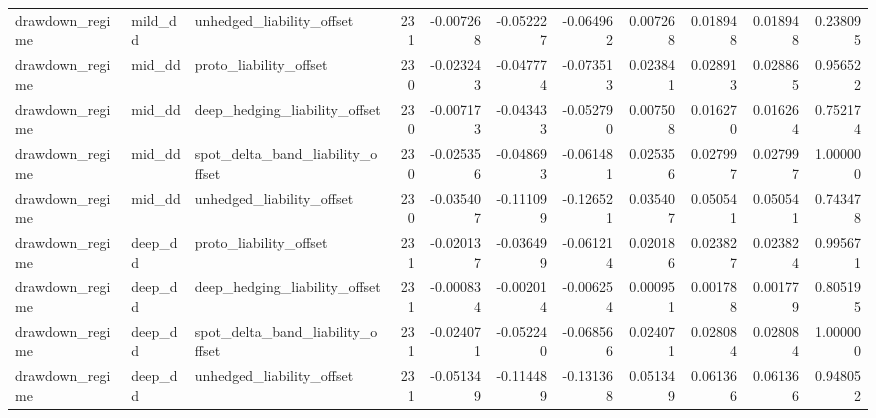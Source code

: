\begin{tabular}{lllrrrrrrrr}
drawdown\_regime & mild\_dd & unhedged\_liability\_offset & 231 & -0.007268 & -0.052227 & -0.064962 & 0.007268 & 0.018948 & 0.018948 & 0.238095 \\
drawdown\_regime & mid\_dd & proto\_liability\_offset & 230 & -0.023243 & -0.047774 & -0.073513 & 0.023841 & 0.028913 & 0.028865 & 0.956522 \\
drawdown\_regime & mid\_dd & deep\_hedging\_liability\_offset & 230 & -0.007173 & -0.043433 & -0.052790 & 0.007508 & 0.016270 & 0.016264 & 0.752174 \\
drawdown\_regime & mid\_dd & spot\_delta\_band\_liability\_offset & 230 & -0.025356 & -0.048693 & -0.061481 & 0.025356 & 0.027997 & 0.027997 & 1.000000 \\
drawdown\_regime & mid\_dd & unhedged\_liability\_offset & 230 & -0.035407 & -0.111099 & -0.126521 & 0.035407 & 0.050541 & 0.050541 & 0.743478 \\
drawdown\_regime & deep\_dd & proto\_liability\_offset & 231 & -0.020137 & -0.036499 & -0.061214 & 0.020186 & 0.023827 & 0.023824 & 0.995671 \\
drawdown\_regime & deep\_dd & deep\_hedging\_liability\_offset & 231 & -0.000834 & -0.002014 & -0.006254 & 0.000951 & 0.001788 & 0.001779 & 0.805195 \\
drawdown\_regime & deep\_dd & spot\_delta\_band\_liability\_offset & 231 & -0.024071 & -0.052240 & -0.068566 & 0.024071 & 0.028084 & 0.028084 & 1.000000 \\
drawdown\_regime & deep\_dd & unhedged\_liability\_offset & 231 & -0.051349 & -0.114489 & -0.131368 & 0.051349 & 0.061366 & 0.061366 & 0.948052 \\
\bottomrule
\end{tabular}

